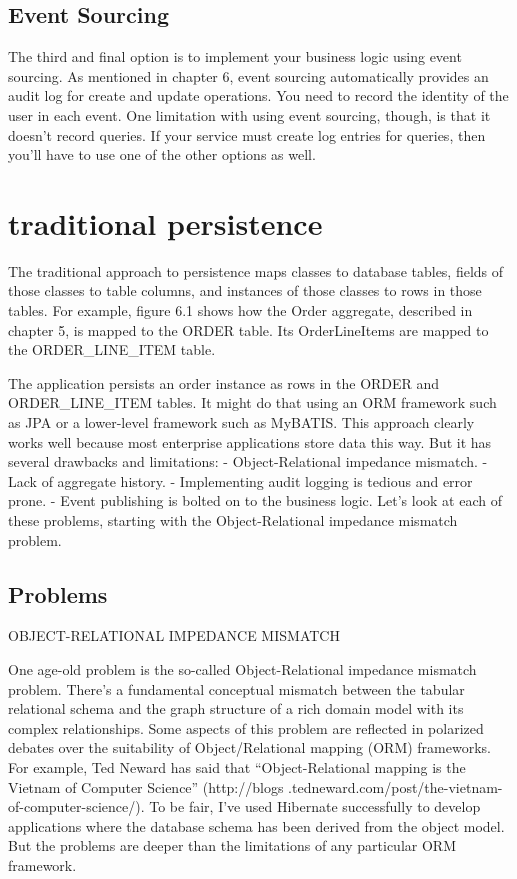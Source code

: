 \subsection{Event Sourcing}

The third and final option is to implement your business logic using event sourcing.
As mentioned in chapter 6, event sourcing automatically provides an audit log for create and update operations. You need to record the identity of the user in each event.
One limitation with using event sourcing, though, is that it doesn’t record queries. If
your service must create log entries for queries, then you’ll have to use one of the
other options as well.

\section{traditional persistence}

The traditional approach to persistence maps classes to database tables, fields of those
classes to table columns, and instances of those classes to rows in those tables. For
example, figure 6.1 shows how the Order aggregate, described in chapter 5, is mapped to the ORDER table. Its OrderLineItems are mapped to the ORDER\_LINE\_ITEM table.

The application persists an order instance as rows in the ORDER and ORDER\_LINE\_ITEM
tables. It might do that using an ORM framework such as JPA or a lower-level framework such as MyBATIS.
 This approach clearly works well because most enterprise applications store data
this way. But it has several drawbacks and limitations:
- Object-Relational impedance mismatch.
- Lack of aggregate history.
- Implementing audit logging is tedious and error prone.
- Event publishing is bolted on to the business logic.
Let’s look at each of these problems, starting with the Object-Relational impedance
mismatch problem. \citep{richardson2018microservices}

\subsection{Problems}

OBJECT-RELATIONAL IMPEDANCE MISMATCH

One age-old problem is the so-called Object-Relational impedance mismatch problem.
There’s a fundamental conceptual mismatch between the tabular relational schema
and the graph structure of a rich domain model with its complex relationships.
Some aspects of this problem are reflected in polarized debates over the suitability of
Object/Relational mapping (ORM) frameworks. For example, Ted Neward has said
that “Object-Relational mapping is the Vietnam of Computer Science” (http://blogs
.tedneward.com/post/the-vietnam-of-computer-science/). To be fair, I’ve used
Hibernate successfully to develop applications where the database schema has been
derived from the object model. But the problems are deeper than the limitations of
any particular ORM framework. 

